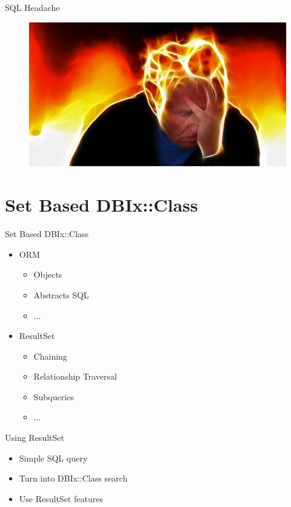 \begin{frame}{SQL Headache}
\begin{figure}[!ht]
\centering
\includegraphics[width=1\linewidth]{img/stress.jpg}
\end{figure}
\end{frame}

\section{Set Based DBIx::Class}


\begin{frame}{Set Based DBIx::Class}
\begin{itemize}
\item ORM
\begin{itemize}
\item Objects
\item Abstracts SQL
\item ...
\end{itemize}
\item ResultSet
\begin{itemize}
\item Chaining
\item Relationship Traversal
\item Subqueries
\item ...
\end{itemize}
\end{itemize}
\end{frame}

\begin{frame}{Using ResultSet}
\begin{itemize}
\item Simple SQL query
\item Turn into DBIx::Class search
\item Use ResultSet features
\end{itemize}
\end{frame}

